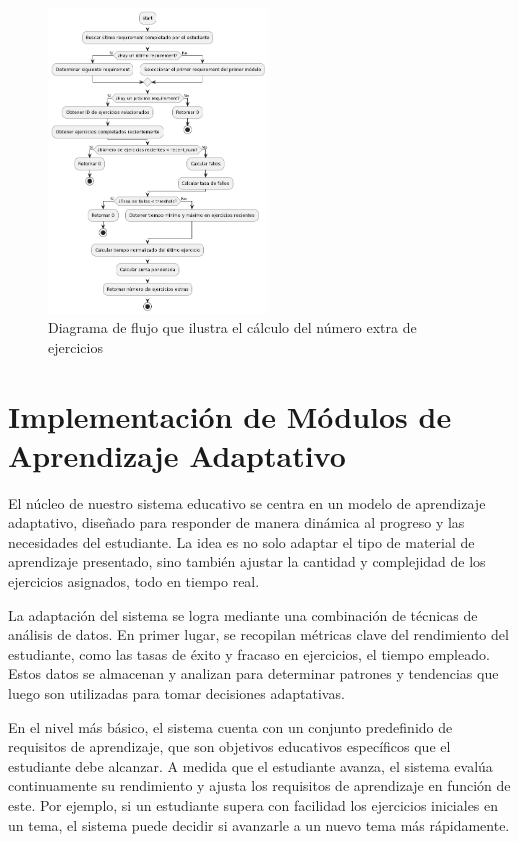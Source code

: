 \begin{figure}[H]
    \centering
    \includegraphics[width=0.52\textwidth]{imagenes/numeroejersextras.png}
    \caption{Diagrama de flujo que ilustra el cálculo del número extra de ejercicios}
    \label{fig:numextraejercicios}
\end{figure}


\section{Implementación de Módulos de Aprendizaje Adaptativo}

El núcleo de nuestro sistema educativo se centra en un modelo de aprendizaje adaptativo, diseñado para responder de manera dinámica al progreso y las necesidades del estudiante. La idea es no solo adaptar el tipo de material de aprendizaje presentado, sino también ajustar la cantidad y complejidad de los ejercicios asignados, todo en tiempo real.

La adaptación del sistema se logra mediante una combinación de técnicas de análisis de datos. En primer lugar, se recopilan métricas clave del rendimiento del estudiante, como las tasas de éxito y fracaso en ejercicios, el tiempo empleado. Estos datos se almacenan y analizan para determinar patrones y tendencias que luego son utilizadas para tomar decisiones adaptativas.

En el nivel más básico, el sistema cuenta con un conjunto predefinido de requisitos de aprendizaje, que son objetivos educativos específicos que el estudiante debe alcanzar. A medida que el estudiante avanza, el sistema evalúa continuamente su rendimiento y ajusta los requisitos de aprendizaje en función de este. Por ejemplo, si un estudiante supera con facilidad los ejercicios iniciales en un tema, el sistema puede decidir si avanzarle a un nuevo tema más rápidamente.

